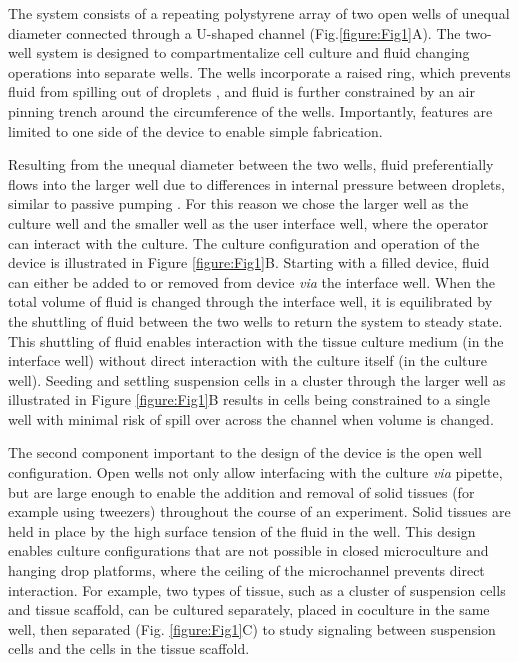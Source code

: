 The system consists of a repeating polystyrene array of two open wells of unequal diameter connected through a U-shaped channel (Fig.\ref{figure:Fig1}A). The two-well system is designed to compartmentalize cell culture and fluid changing operations into separate wells. The wells incorporate a raised ring, which prevents fluid from spilling out of droplets \cite{Hsiao2012a}, and fluid is further constrained by an air pinning trench around the circumference of the wells. Importantly, features are limited to one side of the device to enable simple fabrication. 

Resulting from the unequal diameter between the two wells, fluid preferentially flows into the larger well due to differences in internal pressure between droplets, similar to passive pumping \cite{Walker2002}. For this reason we chose the larger well as the culture well and the smaller well as the user interface well, where the operator can interact with the culture. The culture configuration and operation of the device is illustrated in Figure \ref{figure:Fig1}B. Starting with a filled device, fluid can either be added to or removed from device \textit{via} the interface well. When the total volume of fluid is changed through the interface well, it is equilibrated by the shuttling of fluid between the two wells to return the system to steady state. This shuttling of fluid enables interaction with the tissue culture medium (in the interface well) without direct interaction with the culture itself (in the culture well). Seeding and settling suspension cells in a cluster through the larger well as illustrated in Figure \ref{figure:Fig1}B results in cells being constrained to a single well with minimal risk of spill over across the channel when volume is changed.

The second component important to the design of the device is the open well configuration. Open wells not only allow interfacing with the culture \textit{via} pipette, but are large enough to enable the addition and removal of solid tissues (for example using tweezers) throughout the course of an experiment. Solid tissues are held in place by the high surface tension of the fluid in the well. This design enables culture configurations that are not possible in closed microculture and hanging drop platforms, where the ceiling of the microchannel prevents direct interaction. For example, two types of tissue, such as a cluster of suspension cells and tissue scaffold, can be cultured separately, placed in coculture in the same well, then separated (Fig. \ref{figure:Fig1}C) to study signaling between suspension cells and the cells in the tissue scaffold.

